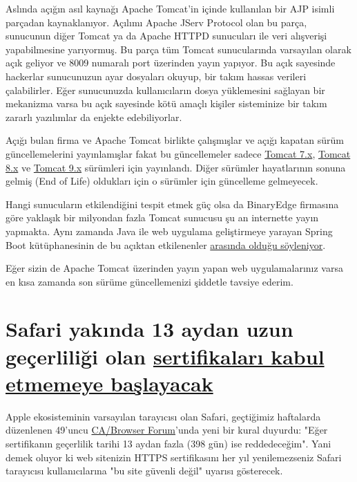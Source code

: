 \documentclass[11pt]{article}
\begin{document}
Aslında açığın asıl kaynağı Apache Tomcat'in içinde kullanılan bir AJP isimli
parçadan kaynaklanıyor. Açılımı Apache JServ Protocol olan bu parça, sunucunun
diğer Tomcat ya da Apache HTTPD sunucuları ile veri alışverişi yapabilmesine
yarıyormuş. Bu parça tüm Tomcat sunucularında varsayılan olarak açık geliyor
ve 8009 numaralı port üzerinden yayın yapıyor. Bu açık sayesinde hackerlar
sunucunuzun ayar dosyaları okuyup, bir takım hassas verileri çalabilirler.
Eğer sunucunuzda kullanıcıların dosya yüklemesini sağlayan bir mekanizma varsa
bu açık sayesinde kötü amaçlı kişiler sisteminize bir takım zararlı yazılımlar
da enjekte edebiliyorlar.

Açığı bulan firma ve Apache Tomcat birlikte çalışmışlar ve açığı kapatan sürüm
güncellemelerini yayınlamışlar fakat bu güncellemeler sadece \href{https://tomcat.apache.org/security-7.html\#Fixed\_in\_Apache\_Tomcat\_7.0.100}{Tomcat 7.x},
\href{https://tomcat.apache.org/security-8.html\#Fixed\_in\_Apache\_Tomcat\_8.5.51}{Tomcat 8.x} ve \href{https://tomcat.apache.org/security-9.html\#Fixed\_in\_Apache\_Tomcat\_9.0.31}{Tomcat 9.x} sürümleri için yayınlandı. Diğer sürümler
hayatlarının sonuna gelmiş (End of Life) oldukları için o sürümler için
güncelleme gelmeyecek.

Hangi sunucuların etkilendiğini tespit etmek güç olsa da BinaryEdge firmasına
göre yaklaşık bir milyondan fazla Tomcat sunucusu şu an internette yayın
yapmakta. Aynı zamanda Java ile web uygulama geliştirmeye yarayan Spring Boot
kütüphanesinin de bu açıktan etkilenenler \href{https://snyk.io/blog/ghostcat-breach-affects-all-tomcat-versions/}{arasında olduğu söyleniyor}.

Eğer sizin de Apache Tomcat üzerinden yayın yapan web uygulamalarınız varsa
en kısa zamanda son sürüme güncellemenizi şiddetle tavsiye ederim.
\section{Safari yakında 13 aydan uzun geçerliliği olan \href{https://thenextweb.com/security/2020/02/24/safari-will-soon-reject-any-https-certificate-valid-for-more-than-13-months/}{sertifikaları kabul etmemeye başlayacak}}
\label{sec:org919bbe8}
Apple ekosisteminin varsayılan tarayıcısı olan Safari, geçtiğimiz haftalarda
düzenlenen 49'uncu \href{https://cabforum.org/}{CA/Browser Forum}'unda yeni bir kural duyurdu: "Eğer
sertifikanın geçerlilik tarihi 13 aydan fazla (398 gün) ise reddedeceğim".
Yani demek oluyor ki web sitenizin HTTPS sertifikasını her yıl yenilemezseniz
Safari tarayıcısı kullanıcılarına "bu site güvenli değil" uyarısı gösterecek.
\end{document}
